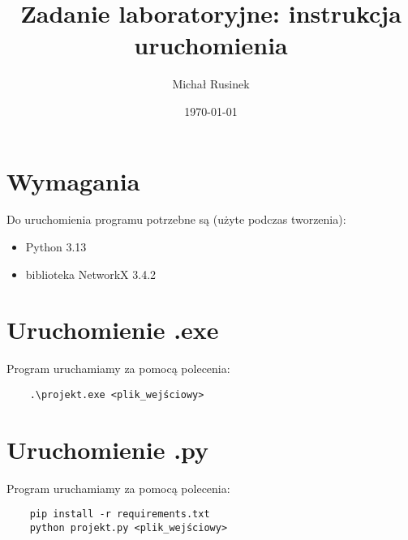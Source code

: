 \documentclass[a4paper, 12pt]{article}
\title{Zadanie laboratoryjne: instrukcja uruchomienia}
\author{Michał Rusinek}
\date{\today}
\begin{document}
\maketitle
\thispagestyle{empty}
\newpage

\section{Wymagania}
Do uruchomienia programu potrzebne są (użyte podczas tworzenia):
\begin{itemize}
    \item Python 3.13
    \item biblioteka NetworkX 3.4.2
\end{itemize}

\section{Uruchomienie .exe}
Program uruchamiamy za pomocą polecenia:
\begin{verbatim}
    .\projekt.exe <plik_wejściowy>
\end{verbatim}

\section{Uruchomienie .py}
Program uruchamiamy za pomocą polecenia:
\begin{verbatim}
    pip install -r requirements.txt
    python projekt.py <plik_wejściowy>
\end{verbatim}
\end{document}
